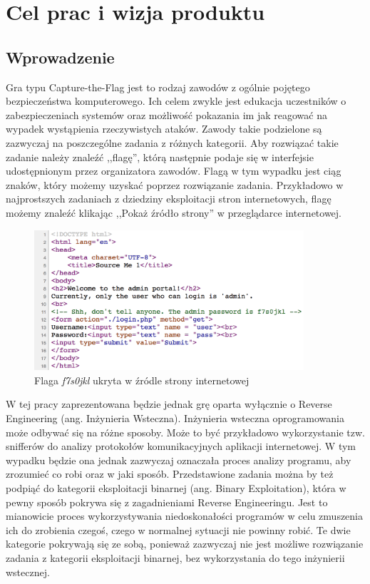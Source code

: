 \documentclass[language=polish,type=eng]{aghmodern}
\author{Piotr Szczygieł}
\date{2020}
\begin{document}
\frontmatter
\maketitle
\tableofcontents

\mainmatter

\chapter{Cel prac i wizja produktu}

\section{Wprowadzenie}

Gra typu Capture-the-Flag jest to rodzaj zawodów z ogólnie pojętego
bezpieczeństwa komputerowego. Ich celem zwykle jest edukacja uczestników
o zabezpieczeniach systemów oraz możliwość pokazania im jak reagować
na wypadek wystąpienia rzeczywistych ataków. Zawody takie podzielone są zazwyczaj
na poszczególne zadania z różnych kategorii. Aby rozwiązać takie zadanie należy
znaleźć ,,flagę'', którą następnie podaje się w interfejsie udostępnionym przez
organizatora zawodów. Flagą w tym wypadku jest ciąg znaków, który możemy uzyskać
poprzez rozwiązanie zadania. Przykładowo w najprostszych zadaniach
z dziedziny eksploitacji stron internetowych, flagę możemy znaleźć klikając
,,Pokaż źródło strony'' w przeglądarce internetowej.

\begin{figure}[H]
\centering
\includegraphics[width=10cm]{flag_page_source}
\caption{Flaga \emph{f7s0jkl} ukryta w źródle strony internetowej}
\end{figure}

W tej pracy zaprezentowana będzie jednak grę oparta
wyłącznie o Reverse Engineering (ang. Inżynieria Wsteczna).
Inżynieria wsteczna oprogramowania może odbywać się na różne sposoby.
Może to być przykładowo wykorzystanie tzw. snifferów do analizy protokołów
komunikacyjnych aplikacji internetowej. W tym wypadku będzie ona jednak
zazwyczaj oznaczała proces analizy programu, aby zrozumieć co robi
oraz w jaki sposób. Przedstawione zadania można by też podpiąć do kategorii
eksploitacji binarnej (ang. Binary Exploitation), która w pewny sposób pokrywa
się z zagadnieniami Reverse Engineeringu. Jest to mianowicie proces
wykorzystywania niedoskonałości programów w celu zmuszenia ich do zrobienia
czegoś, czego w normalnej sytuacji nie powinny robić. Te dwie kategorie pokrywają
się ze sobą, ponieważ zazwyczaj nie jest możliwe rozwiązanie zadania z kategorii
eksploitacji binarnej, bez wykorzystania do tego inżynierii wstecznej.
\end{document}
